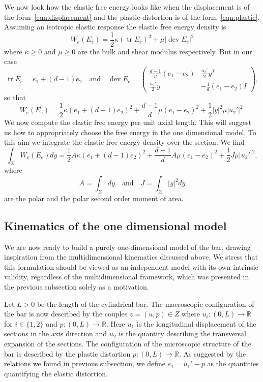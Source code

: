 \documentclass[a4paper,10pt,twoside]{amsbook}
\numberwithin{section}{chapter}
\numberwithin{equation}{chapter}
\theoremstyle{definition}
\DeclareMathOperator{\dev}{dev}
\DeclareMathOperator{\tr}{tr}
\begin{document}
We now look how the elastic free energy looks like when the displacement is of the form~\eqref{eqn:displacement} and the plastic distortion is of the form~\eqref{eqn:plastic}. Assuming an isotropic elastic response the elastic free energy density is
\[
W_e(E_e)=\frac{1}{2}\kappa(\tr E_e)^2+\mu|\dev E_e|^2
\]
where $\kappa\ge0$ and $\mu\ge0$ are the bulk and shear modulus respectively. But in our case
\[
\tr E_e=e_1+(d-1)e_2\quad\text{and}\quad\dev E_e=\begin{pmatrix}
\frac{d-1}{d}(e_1-e_2) & \frac{u_2'}{2}y^T \\
\frac{u_2'}{2}y & -\frac{1}{d}(e_1-e_2)I
\end{pmatrix},
\]
so that
\[
W_e(E_e)=\frac{1}{2}\kappa\left(e_1+(d-1)e_2\right)^2+\frac{d-1}{d}\mu(e_1-e_2)^2+\frac{1}{2}|y|^2\mu|u_2'|^2.
\]
We now compute the elastic free energy per unit axial length. This will suggest us how to appropriately choose the free energy in the one dimensional model. To this aim we integrate the elastic free energy density over the section. We find
\begin{equation}
\label{eqn:necking-small:constitutive-multidimensional}
\int_\Sigma W_e(E_e)dy=\frac{1}{2}A\kappa\left(e_1+(d-1)e_2\right)^2+\frac{d-1}{d}A\mu(e_1-e_2)^2+\frac{1}{2}J\mu|u_2'|^2,
\end{equation}
where
\[
A=\int_\Sigma dy\quad\text{and}\quad J=\int_\Sigma|y|^2dy
\]
are the polar and the polar second order moment of area.

\subsection{Kinematics of the one dimensional model}

We are now ready to build a purely one-dimensional model of the bar, drawing inspiration from the multidimensional kinematics discussed above. We stress that this formulation should be viewed as an independent model with its own intrinsic validity, regardless of the multidimensional framework, which was presented in the previous subsection solely as a motivation.

Let $L>0$ be the length of the cylindrical bar. The macroscopic configuration of the bar is now described by the couples $z=(u,p)\in Z$ where $u_i\colon(0,L)\to\mathbb{R}$ for $i\in\{1,2\}$ and $p\colon(0,L)\to\mathbb{R}$. Here $u_1$ is the longitudinal displacement of the sections in the axis direction and $u_2$ is the quantity describing the transversal expansion of the sections. The configuration of the microscopic structure of the bar is described by the plastic distortion $p\colon(0,L)\to\mathbb{R}$. As suggested by the relations we found in previous subsection, we define $e_1=u_1'-p$ as the quantities quantifying the elastic distortion.
\end{document}
